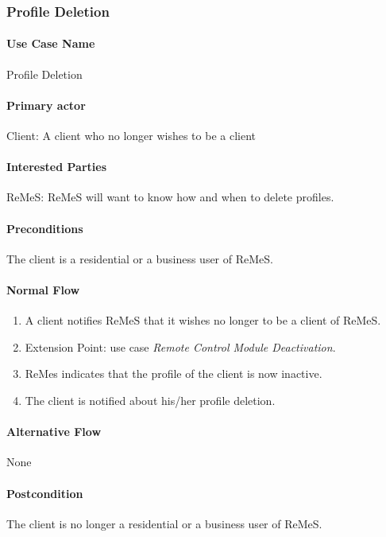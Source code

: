 \subsubsection{Profile Deletion}

\paragraph{Use Case Name}
Profile Deletion
\paragraph{Primary actor}
Client: A client who no longer wishes to be a client
\paragraph{Interested Parties}
ReMeS: ReMeS will want to know how and when to delete profiles.
\paragraph{Preconditions}
The client is a residential or a business user of ReMeS.
\paragraph{Normal Flow}
\begin{enumerate}
	\item A client notifies ReMeS that it wishes no longer to be a client of ReMeS.
	\item Extension Point: use case \textit{Remote Control Module Deactivation}.
	\item ReMes indicates that the profile of the client is now inactive.
	\item The client is notified about his/her profile deletion.
\end{enumerate}

\paragraph{Alternative Flow}
None

\paragraph{Postcondition}
The client is no longer a residential or a business user of ReMeS.
